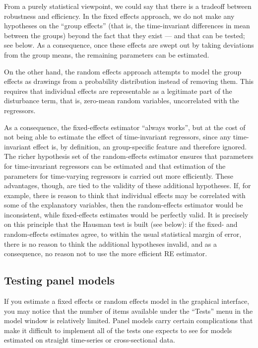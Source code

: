 From a purely statistical viewpoint, we could say that there is a
tradeoff between robustness and efficiency. In the fixed effects
approach, we do not make any hypotheses on the ``group effects'' (that
is, the time-invariant differences in mean between the groups) beyond
the fact that they exist --- and that can be tested; see below. As a
consequence, once these effects are swept out by taking deviations
from the group means, the remaining parameters can be estimated.

On the other hand, the random effects approach attempts to model the
group effects as drawings from a probability distribution instead of
removing them. This requires that individual effects are representable
as a legitimate part of the disturbance term, that is, zero-mean
random variables, uncorrelated with the regressors.

As a consequence, the fixed-effects estimator ``always works'', but at
the cost of not being able to estimate the effect of time-invariant
regressors, since any time-invariant effect is, by definition, an
group-specific feature and therefore ignored.  The richer hypothesis
set of the random-effects estimator ensures that parameters for
time-invariant regressors can be estimated and that estimation of the
parameters for time-varying regressors is carried out more
efficiently.  These advantages, though, are tied to the validity of
these additional hypotheses. If, for example, there is reason to think
that individual effects may be correlated with some of the explanatory
variables, then the random-effects estimator would be inconsistent,
while fixed-effects estimates would be perfectly valid.  It is
precisely on this principle that the Hausman test is built (see
below): if the fixed- and random-effects estimates agree, to within
the usual statistical margin of error, there is no reason to think the
additional hypotheses invalid, and as a consequence, no reason not to
use the more efficient RE estimator.

\subsection{Testing panel models}
\label{panel-tests}

If you estimate a fixed effects or random effects model in the
graphical interface, you may notice that the number of items available
under the ``Tests'' menu in the model window is relatively limited.
Panel models carry certain complications that make it difficult to
implement all of the tests one expects to see for models estimated on
straight time-series or cross-sectional data.  

